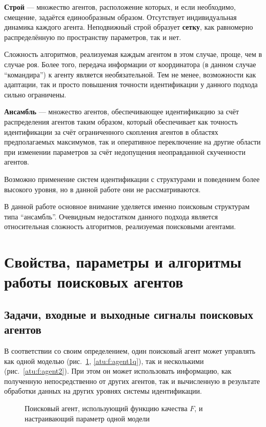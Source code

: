 \textbf{ Строй } --- множество агентов, расположение которых,
и если необходимо, смещение, задаётся
единообразным образом.
Отсутствует индивидуальная динамика каждого агента.
Неподвижный строй образует \textbf{сетку},
как равномерно распределённую по пространству параметров,
так и нет.

Сложность алгоритмов, реализуемая каждым агентом в этом случае,
проще, чем в случае роя. Более того, передача информации от
координатора (в данном случае ``командира'') к агенту
является необязательной.
Тем не менее, возможности как адаптации,
так и просто повышения точности идентификации
у данного подхода сильно ограничены.

\textbf{ Ансамбль } --- множество агентов, обеспечивающее идентификацию за счёт
распределения агентов таким образом, который обеспечивает как
точность идентификации за счёт ограниченного скопления агентов
в областях предполагаемых максимумов, так и оперативное переключение
на другие области при изменении параметров за счёт недопущения
неоправданной скученности агентов.

Возможно применение систем идентификации с структурами и поведением более высокого уровня,
но в данной работе они не рассматриваются.

В данной работе основное внимание уделяется именно
поисковым структурам типа ``ансамбль''.
Очевидным недостатком данного подхода является
относительная сложность алгоритмов, реализуемая поисковыми агентами.




\section{Свойства, параметры и алгоритмы работы поисковых агентов}  %

\subsection{Задачи, входные и выходные сигналы поисковых агентов} %

В соответствии со своим определением,
один поисковый агент может управлять как одной моделью (рис.~\ref{atu:f:agent1}, \ref{atu:f:agent1q}),
так и несколькими (рис.~\ref{atu:f:agent2}).
При этом он может использовать информацию,
как полученную непосредственно от других агентов,
так и вычисленную в результате обработки данных на других уровнях системы идентификации.

\begin{figure}[htb!]
\begin{center}

\end{center}
\caption{Поисковый агент, использующий функцию качества $F$, и настраивающий параметр одной модели}
\label{atu:f:agent1}
\end{figure}


